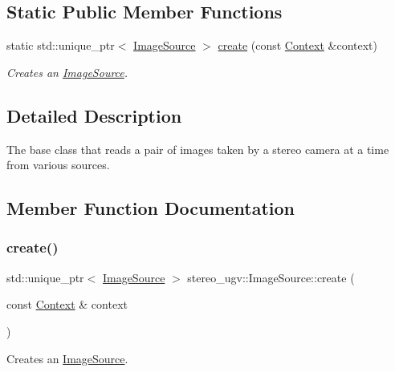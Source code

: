 \subsection*{Static Public Member Functions}
\begin{DoxyCompactItemize}
\item 
static std\+::unique\+\_\+ptr$<$ \hyperlink{classstereo__ugv_1_1ImageSource}{Image\+Source} $>$ \hyperlink{classstereo__ugv_1_1ImageSource_a18a1a40c3b5d51788bf4c68a4186ca31}{create} (const \hyperlink{classstereo__ugv_1_1Context}{Context} \&context)
\begin{DoxyCompactList}\small\item\em Creates an \hyperlink{classstereo__ugv_1_1ImageSource}{Image\+Source}. \end{DoxyCompactList}\end{DoxyCompactItemize}


\subsection{Detailed Description}
The base class that reads a pair of images taken by a stereo camera at a time from various sources. 

\subsection{Member Function Documentation}
\mbox{\label{classstereo__ugv_1_1ImageSource_a18a1a40c3b5d51788bf4c68a4186ca31}} 
\subsubsection{\texorpdfstring{create()}{create()}}
{\footnotesize\ttfamily std\+::unique\+\_\+ptr$<$ \hyperlink{classstereo__ugv_1_1ImageSource}{Image\+Source} $>$ stereo\+\_\+ugv\+::\+Image\+Source\+::create (\begin{DoxyParamCaption}\item[{const \hyperlink{classstereo__ugv_1_1Context}{Context} \&}]{context }\end{DoxyParamCaption})\hspace{0.3cm}{\ttfamily [static]}}



Creates an \hyperlink{classstereo__ugv_1_1ImageSource}{Image\+Source}. 

